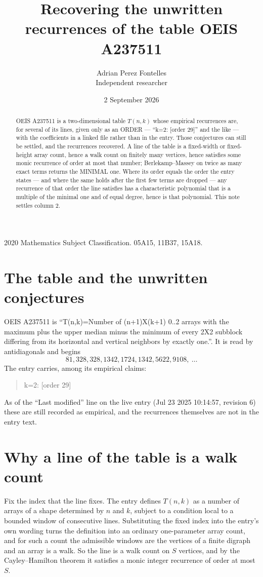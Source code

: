 \documentclass[11pt,a4paper]{article}
\title{Recovering the unwritten recurrences of the table OEIS A237511}
\author{Adrian Perez Fontelles\\ \small Independent researcher}
\date{2 September 2026}
\theoremstyle{plain}
\theoremstyle{definition}
\begin{document}
\maketitle

\begin{abstract}
OEIS A237511 is a two-dimensional table $T(n,k)$ whose empirical recurrences are, for several of
its lines, given only as an ORDER --- ``k=2: [order 29]'' and the like --- with the
coefficients in a linked file rather than in the entry. Those conjectures can still be settled,
and the recurrences recovered. A line of the table is a fixed-width or fixed-height array
count, hence a walk count on finitely many vertices, hence satisfies some monic recurrence of
order at most that number; Berlekamp--Massey on twice as many exact terms returns the MINIMAL
one. Where its order equals the order the entry states --- and where the same holds after the
first few terms are dropped --- any recurrence of that order the line satisfies has a
characteristic polynomial that is a multiple of the minimal one and of equal degree, hence is
that polynomial. This note settles column 2.
\end{abstract}

\noindent\small 2020 Mathematics Subject Classification. 05A15, 11B37, 15A18.\normalsize

\section{The table and the unwritten conjectures}

OEIS A237511 is ``T(n,k)=Number of (n+1)X(k+1) 0..2 arrays with the maximum plus the upper median minus the minimum of every 2X2 subblock differing from its horizontal and vertical neighbors by exactly one.''. It is read by antidiagonals and begins
\[
81, 328, 328, 1342, 1724, 1342, 5622, 9108,\ \dots
\]
The entry carries, among its empirical claims:
\begin{quote}\small
k=2: [order 29]
\end{quote}
As of the ``Last modified'' line on the live entry (Jul 23 2025 10:14:57, revision 6) these are still
recorded as empirical, and the recurrences themselves are not in the entry text.

\section{Why a line of the table is a walk count}

Fix the index that the line fixes. The entry defines $T(n,k)$ as a number of arrays of a shape
determined by $n$ and $k$, subject to a condition local to a bounded window of consecutive
lines. Substituting the fixed index into the entry's own wording turns the definition into an
ordinary one-parameter array count, and for such a count the admissible windows are the
vertices of a finite digraph and an array is a walk. So the line is a walk count on $S$
vertices, and by the Cayley--Hamilton theorem it satisfies a monic integer recurrence of order
at most $S$.
\end{document}

